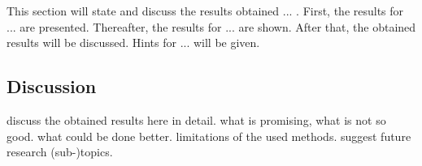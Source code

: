 This section will state and discuss the results obtained ... . First, the results for ... are presented. Thereafter, the results for ... are shown. After that, the obtained results will be discussed. Hints for ... will be given.




\subsection{Discussion}
\label{ss:discussion_details2}

discuss the obtained results here in detail. what is promising, what is not so good. what could be done better. limitations of the used methods. suggest future research (sub-)topics.










